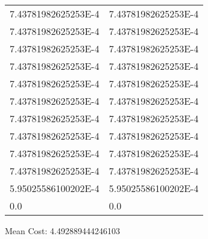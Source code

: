 \documentclass[12pt]{article}
\begin{document}
\begin{tabular}{l l}
7.43781982625253E-4	&	7.43781982625253E-4\\
7.43781982625253E-4	&	7.43781982625253E-4\\
7.43781982625253E-4	&	7.43781982625253E-4\\
7.43781982625253E-4	&	7.43781982625253E-4\\
7.43781982625253E-4	&	7.43781982625253E-4\\
7.43781982625253E-4	&	7.43781982625253E-4\\
7.43781982625253E-4	&	7.43781982625253E-4\\
7.43781982625253E-4	&	7.43781982625253E-4\\
7.43781982625253E-4	&	7.43781982625253E-4\\
7.43781982625253E-4	&	7.43781982625253E-4\\
5.95025586100202E-4	&	5.95025586100202E-4\\
0.0	&	0.0\\
\end{tabular}\newpage
\noindent
\noindent Mean Cost: 4.492889444246103\\
\end{document}
